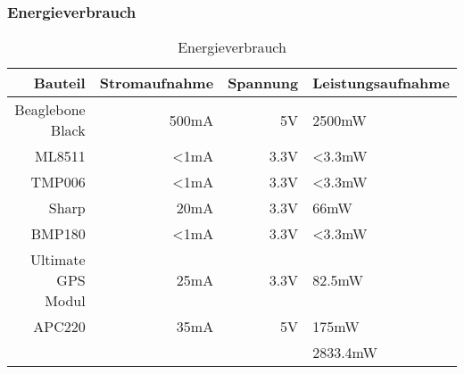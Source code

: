 \subsubsection{Energieverbrauch}
\begin{table}[H]
  \centering
    \begin{tabular}{rrrl}
    \toprule
    \textbf{Bauteil} & \textbf{Stromaufnahme} & \textbf{Spannung} & \textbf{Leistungsaufnahme} \\
    \midrule
    Beaglebone Black  & 500mA & 5V & 2500mW \\
    ML8511& <1mA & 3.3V & <3.3mW \\
    TMP006& <1mA& 3.3V& <3.3mW \\
    Sharp& 20mA & 3.3V& 66mW\\
    BMP180& <1mA& 3.3V& <3.3mW \\
    Ultimate GPS Modul& 25mA&3.3V& 82.5mW \\
    APC220& 35mA & 5V & 175mW\\

    \bottomrule
     & & &2833.4mW \\
    \bottomrule
    \end{tabular}%
    \caption{Energieverbrauch}
  \label{tab:budgetausgaben}%
\end{table}%

